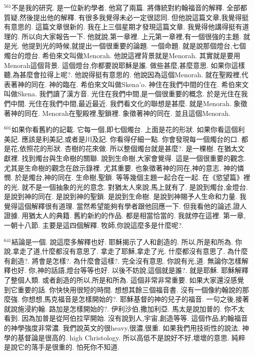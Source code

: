 \documentclass{book}
\begin{document}
$^{561}$不是我的研究.
是一位新約學者.
他寫了兩篇.
將傳統對約翰福音的解釋.
全部都質疑,然後提出他的解釋.
有很多我覺得未必一定很認同.
但他說這篇文章,我覺得挺有意思的.
這篇文章很新的.
我在上三個星期才發現這篇文章.
我覺得他講得挺有道理的.
所以向大家報告一下.
他就說,第一章裡.
上元第一章裡,有一個很強的主題.
就是光.
他提到光的時候,就提出一個很重要的論題.
一個命題.
就是說那個燈台,七個燭台的燈台.
希伯來文叫做Menorah.
他說這裡背景就是Menorah.
其實就是要用Menorah這個背景.
這個燈台,你都要說耶穌是誰.
做些甚麼,甚麼意思.
如果你這樣聽,為甚麼會拉得上呢?.
他說得挺有意思的.
他說因為這個Menorah.
就在聖殿裡,代表著神的同在.
神的臨在.
希伯來文叫做Skena'o.
神住在我們中間的住在.
希伯來文叫做Skena.
我們讀了漢方音.
光住在我們中間,是一個很重要的概念.
於是光住在我們中間.
光住在我們中間,最近最近.
我們看文化的聯想是甚麼.
就是Menorah.
象徵著神的同在.
Menorah在聖殿裡,聖鎖裡.
象徵著神的同在.
並且這個Menorah.

$^{601}$如果你看舊約的記載.
它每一個,即七個燭台.
上面是花的形狀.
如果你看這個利美記.
應該是利美記,或者是川及記.
你看得仔細一點.
你會發現每一個燭台的口.
都是花,依照花的形狀.
杏樹的花來做.
所以整個燭台就是甚麼?.
是一棵樹.
在猶太文獻裡.
找到燭台與生命樹的關聯.
說到生命樹,大家會覺得.
這是一個很重要的觀念.
尤其是生命樹的觀念在啟示錄裡.
尤其重要.
也象徵著神的同在,神的意志.
神的憐憫.
於是燭台,神的同在.
生命樹,聖鎖.
等等幾個主題一起合在一起.
在《慾望篇》裡的光.
就不是一個抽象的光的意念.
對猶太人來說,馬上就有了.
是說到燭台,金燈台.
是說到神的同在.
是說到神的聖鎖.
是說到生命樹.
是說到神賜予人生命和力量.
我覺得這個解釋很有道理.
當然希望能夠有學者跟他回應一下.
但我看他的論述,證人證據.
用猶太人的典籍.
舊約新約的作品.
都是相當恰當的.
我就停在這裡.
第一章,一朝十八節.
主要是這四個解釋.
牧師,你說這麼多是什麼呢?.

$^{641}$結論是一個.
說這麼多解釋也好.
耶穌揭示了人和創造的.
所以,所是和所為.
你說,拿走了道,什麼都沒有意思了.
拿走了耶穌,拿走了光.
什麼都沒有意思了.
為什麼有創造?.
將會是怎樣?.
為什麼會這樣?.
完全沒有意思.
你說有光,道.
無論你怎樣解釋也好.
你,神的話語,燈台等等也好.
以後不妨說,這個就是誰?.
就是耶穌.
耶穌解釋了整個人類.
或者創造的所以,所是和所為.
這個非常非常重要.
如果大家還沒感覺到它重要的話.
你快快用很短的時間.
想想其餘三個福音書.
沒有一個像約翰說的那麼強.
你想想,馬克福音是怎樣開始的?.
耶穌基督的神的兒子的福音.
一句之後,接著就說施浸約翰.
路加是怎樣開始的?.
伊利沙伯,撒加利亞.
馬太是說加普的.
你不太看到.
因為加普是從阿伯拉罕開始.
沒有說到人,宇宙,創造等等.
這個作品,約翰福音的神學強度非常濃.
我們說英文的很heavy,很濃,很重.
如果我們用技術性的說法.
神學的基督論是很高的.
high Christology.
所以高低不是說好不好,壞壞的意思.
純粹是說它的落手是很重的.
怕死你不知道.
\end{document}
